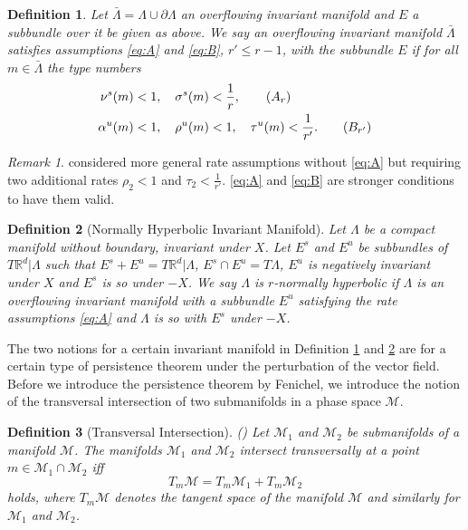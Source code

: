\documentclass[a4paper,11pt]{article}
\def\blue{\color{blue}}
\newtheorem{definition}{Definition}[section]
\theoremstyle{remark}
\newtheorem{remark}{Remark}[section]
\begin{document}
\begin{definition} \label{def:over}
Let $\bar{\Lambda}=\Lambda \cup \partial\Lambda$  an overflowing invariant manifold and $E$ a subbundle over it be given as above. We say an overflowing invariant manifold $\bar{\Lambda}$ satisfies assumptions \eqref{eq:A} and \eqref{eq:B}, $r'\le r-1$, with the subbundle $E$ if for all $m\in \bar{\Lambda}$ the {\blue type numbers}
\begin{align}
\nu^s(m)&<1, \quad \sigma^s(m)<\frac{1}{r}, \label{eq:A}\tag{$A_r$}   \\
\alpha^u(m)&<1, \quad \rho^u(m)<1, \quad \tau^u(m)<\frac{1}{r'}. \label{eq:B}\tag{$B_{r'}$}  
\end{align}
\end{definition}
\begin{remark}
 \cite{fenichel_asymptotic_1977} considered more general {\blue rate} assumptions without \eqref{eq:A} but requiring two additional {\blue rates} $\rho_2<1$ and $\tau_2<\frac{1}{r'}$. \eqref{eq:A} and \eqref{eq:B} are stronger conditions to have them valid. %
\end{remark}
\begin{definition}[Normally Hyperbolic Invariant Manifold] \label{def:nhim}
 Let $\Lambda$ be a compact manifold without boundary, invariant under $X$. Let $E^s$ and $E^u$ be subbundles of $T \mathbb{R}^d|\Lambda$ such that $E^s + E^u = T \mathbb{R}^d|\Lambda$, $E^s\cap E^u=T\Lambda$, $E^u$ is negatively invariant under $X$ and $E^s$ is so under $-X$. We say $\Lambda$ is $r$-normally hyperbolic if $\Lambda$ is an overflowing invariant manifold with a subbundle $E^u$ satisfying the rate assumptions \eqref{eq:A} and $\Lambda$ is so with $E^s$ under $-X$. 
\end{definition}
The two notions for a certain invariant manifold in Definition \ref{def:over} and \ref{def:nhim} are for a certain type of persistence theorem under the perturbation of the vector field. Before we introduce the persistence theorem by Fenichel, we introduce the notion of the transversal intersection of two submanifolds in a phase space $\mathcal{M}$.
\begin{definition}[Transversal Intersection]  (\cite[Definition 3.1]{Sz1991})
 Let ${\mathcal{M}}_1$ and ${\mathcal{M}}_2$ be submanifolds of a manifold ${\mathcal{M}}$. The manifolds ${\mathcal{M}}_1$ and ${\mathcal{M}}_2$ intersect transversally at a point $m\in{\mathcal{M}}_1\cap {\mathcal{M}}_2$ iff 
 $$T_m{\mathcal{M}} =  T_m{\mathcal{M}}_1+T_m{\mathcal{M}}_2$$
 holds, where $T_m\mathcal{M}$ denotes the tangent space of the manifold $\mathcal{M}$ and similarly for $\mathcal{M}_1$ and $\mathcal{M}_2$.
\end{definition}
\end{document}

